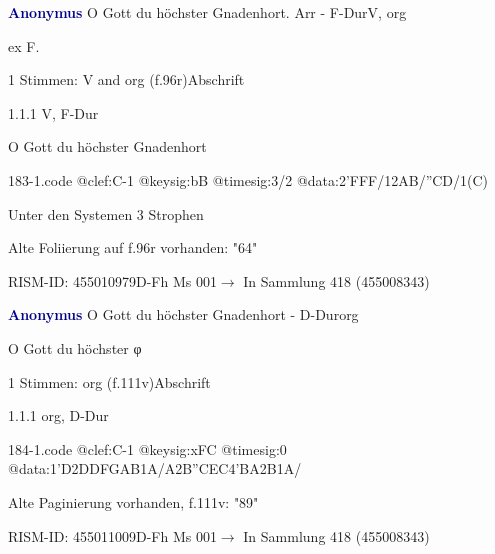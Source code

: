 \documentclass[twocolumn, 12pt]{book}
\begin{document}
\par \vspace{16pt} \textcolor{darkblue}{\textbf{Anonymus  }}\hfillplus{\textbf{[183]}}\newline O Gott du höchster Gnadenhort. Arr - F-Dur\newline V, org
\par \begin{itshape}[f.96r, at left:] ex F.\end{itshape} 
\par \textcolor{darkblue}{}  1 Stimmen: V and org  (f.96r)\newline Abschrift
\par 1.1.1  V, F-Dur\newline \begin{footnotesize} O Gott du höchster Gnadenhort \end{footnotesize}  
\begin{filecontents*}{183-1.code}
@clef:C-1
@keysig:bB
@timesig:3/2
@data:2'FFF/12AB/''CD/1(C)
\end{filecontents*}
\newline %
\par Unter den Systemen 3 Strophen
\par Alte Foliierung auf f.96r vorhanden: "64"
\par RISM-ID: 455010979\newline D-Fh  Ms 001\newline $\rightarrow$ In Sammlung 418 (455008343)
      
\par \vspace{16pt} \textcolor{darkblue}{\textbf{Anonymus  }}\hfillplus{\textbf{[184]}}\newline O Gott du höchster Gnadenhort - D-Dur\newline org
\par \begin{itshape}[f.111v, heading:] O Gott du höchster φ\end{itshape} 
\par \textcolor{darkblue}{}  1 Stimmen: org  (f.111v)\newline Abschrift
\par 1.1.1  org, D-Dur  
\begin{filecontents*}{184-1.code}
@clef:C-1
@keysig:xFC
@timesig:0
@data:1'D2DDFGAB1A/A2B''CEC4'BA2B1A/
\end{filecontents*}
\newline %
\par Alte Paginierung vorhanden, f.111v: "89"
\par RISM-ID: 455011009\newline D-Fh  Ms 001\newline $\rightarrow$ In Sammlung 418 (455008343)
      
\end{document}
